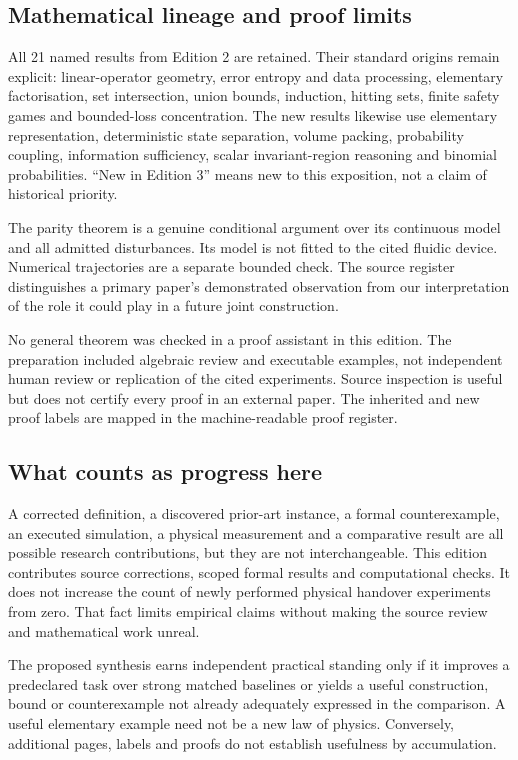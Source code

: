\documentclass[11pt,a4paper]{article}
\theoremstyle{definition}
\theoremstyle{remark}
\begin{document}
\subsection{Mathematical lineage and proof limits}
All 21 named results from Edition 2 are retained. Their standard origins remain explicit: linear-operator geometry, error entropy and data processing, elementary factorisation, set intersection, union bounds, induction, hitting sets, finite safety games and bounded-loss concentration. The new results likewise use elementary representation, deterministic state separation, volume packing, probability coupling, information sufficiency, scalar invariant-region reasoning and binomial probabilities. ``New in Edition 3'' means new to this exposition, not a claim of historical priority.

The parity theorem is a genuine conditional argument over its continuous model and all admitted disturbances. Its model is not fitted to the cited fluidic device. Numerical trajectories are a separate bounded check. The source register distinguishes a primary paper's demonstrated observation from our interpretation of the role it could play in a future joint construction.

No general theorem was checked in a proof assistant in this edition. The preparation included algebraic review and executable examples, not independent human review or replication of the cited experiments. Source inspection is useful but does not certify every proof in an external paper. The inherited and new proof labels are mapped in the machine-readable proof register.

\subsection{What counts as progress here}
A corrected definition, a discovered prior-art instance, a formal counterexample, an executed simulation, a physical measurement and a comparative result are all possible research contributions, but they are not interchangeable. This edition contributes source corrections, scoped formal results and computational checks. It does not increase the count of newly performed physical handover experiments from zero. That fact limits empirical claims without making the source review and mathematical work unreal.

The proposed synthesis earns independent practical standing only if it improves a predeclared task over strong matched baselines or yields a useful construction, bound or counterexample not already adequately expressed in the comparison. A useful elementary example need not be a new law of physics. Conversely, additional pages, labels and proofs do not establish usefulness by accumulation.
\end{document}
